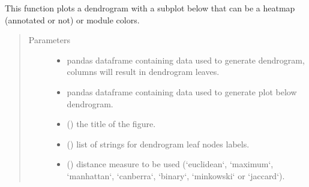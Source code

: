 \documentclass[letterpaper,10pt,english]{sphinxmanual}
\begin{document}
\begin{fulllineitems}
\label{\detokenize{_autosummary/analytics_core.viz:analytics_core.viz.wgcnaFigures.plot_complex_dendrogram}}
This function plots a dendrogram with a subplot below that can be a heatmap (annotated or not) or module colors.
\begin{quote}\begin{description}
\item[{Parameters}] \leavevmode\begin{itemize}
\item {} 
 \textendash{} pandas dataframe containing data used to generate dendrogram, columns will result in dendrogram leaves.

\item {} 
 \textendash{} pandas dataframe containing data used to generate plot below dendrogram.

\item {} 
 () \textendash{} the title of the figure.

\item {} 
 () \textendash{} list of strings for dendrogram leaf nodes labels.

\item {} 
 () \textendash{} distance measure to be used (‘euclidean‘, ‘maximum‘, ‘manhattan‘, ‘canberra‘, ‘binary‘, ‘minkowski‘ or ‘jaccard‘).


\end{itemize}
\end{description}
\end{quote}
\end{fulllineitems}
\end{document}
